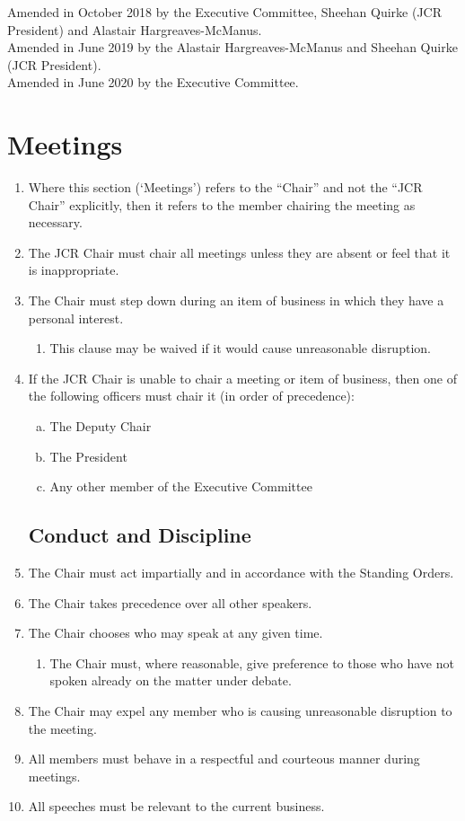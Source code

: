 \documentclass[12pt]{article}
\begin{document}
Amended in October 2018 by the Executive Committee, Sheehan Quirke (JCR President) and Alastair Hargreaves-McManus.\\
Amended in June 2019 by the Alastair Hargreaves-McManus and Sheehan Quirke (JCR President).\\
Amended in June 2020 by the Executive Committee.
\newpage
\tableofcontents{}
\newpage


\section{Meetings}
\begin{enumerate}
    \subsection{The Chair}
    \item Where this section (‘Meetings’) refers to the “Chair” and not the “JCR Chair” explicitly, then it refers to the member chairing the meeting as necessary.
    \item The JCR Chair must chair all meetings unless they are absent or feel that it is inappropriate.
    \item The Chair must step down during an item of business in which they have a personal interest.
    \begin{enumerate}
        \item This clause may be waived if it would cause unreasonable disruption.
    \end{enumerate}
    \item If the JCR Chair is unable to chair a meeting or item of business, then one of the following officers must chair it (in order of precedence):
    \begin{enumerate}[(a)]
        \item The Deputy Chair
        \item The President
        \item Any other member of the Executive Committee
    \end{enumerate}
    \subsection{Conduct and Discipline}
    \item The Chair must act impartially and in accordance with the Standing Orders.
    \item The Chair takes precedence over all other speakers.
    \item The Chair chooses who may speak at any given time.
    \begin{enumerate}
        \item The Chair must, where reasonable, give preference to those who have not spoken already on the matter under debate.
    \end{enumerate}
    \item The Chair may expel any member who is causing unreasonable disruption to the meeting.
    \item All members must behave in a respectful and courteous manner during meetings.
    \item All speeches must be relevant to the current business.

\end{enumerate}
\end{document}
